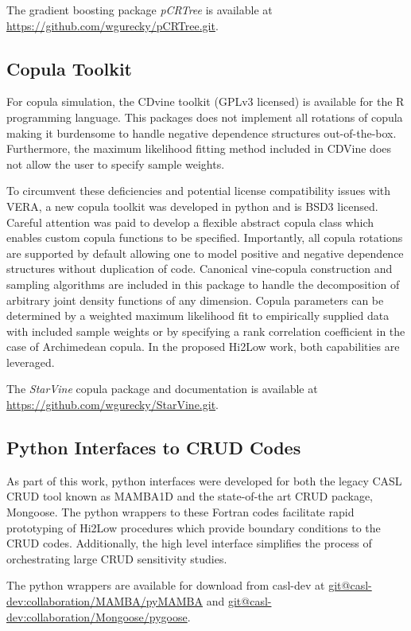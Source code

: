 The gradient boosting package \emph{pCRTree} is available at \url{https://github.com/wgurecky/pCRTree.git}.

\subsection{Copula Toolkit}

For copula simulation, the CDvine toolkit (GPLv3 licensed) is available for the R programming language. This packages does not implement all rotations of copula making it burdensome to handle negative dependence structures out-of-the-box.  Furthermore, the maximum likelihood fitting method included in CDVine does not allow the user to specify sample weights.

To circumvent these deficiencies and potential license compatibility issues with VERA, a new copula toolkit was developed in python and is BSD3 licensed.
Careful attention was paid to develop a flexible abstract copula class which enables custom copula functions to be specified.  Importantly, all copula rotations are supported by default allowing one to model positive and negative dependence structures without duplication of code.
Canonical vine-copula construction and sampling algorithms are included in this package to handle the decomposition of arbitrary joint density functions of any dimension.
Copula parameters can be determined by a weighted maximum likelihood fit to empirically supplied data with included sample weights or by specifying a rank correlation coefficient in the case of Archimedean copula.  In the proposed Hi2Low work, both capabilities are leveraged.

The \emph{StarVine} copula package and documentation is available at \url{https://github.com/wgurecky/StarVine.git}.

\subsection{Python Interfaces to CRUD Codes}

As part of this work, python interfaces were developed for both the legacy CASL CRUD tool known as MAMBA1D and the state-of-the art CRUD package, Mongoose.  The python wrappers to these Fortran codes facilitate rapid prototyping of Hi2Low procedures which provide boundary conditions to the CRUD codes.  Additionally, the high level interface simplifies the process of orchestrating large CRUD sensitivity studies.

The python wrappers are available for download from casl-dev at \url{git@casl-dev:collaboration/MAMBA/pyMAMBA} and \url{git@casl-dev:collaboration/Mongoose/pygoose}.

